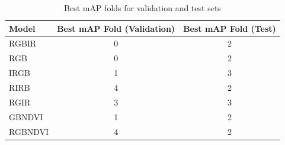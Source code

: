 



\begin{table}[h!]
\centering

\begin{tabular}{lcc}
\hline
\textbf{Model} & \textbf{Best mAP Fold (Validation)} & \textbf{Best mAP Fold (Test)} \\ \hline
RGBIR    & 0 & 2 \\
RGB      & 0 & 2 \\
IRGB     & 1 & 3 \\
RIRB     & 4 & 2 \\
RGIR     & 3 & 3 \\
GBNDVI   & 1 & 2 \\
RGBNDVI  & 4 & 2 \\ \hline
\end{tabular}
\caption{Best mAP folds for validation and test sets}
\label{tab:best_map_fold_perm_exp}
\end{table}




